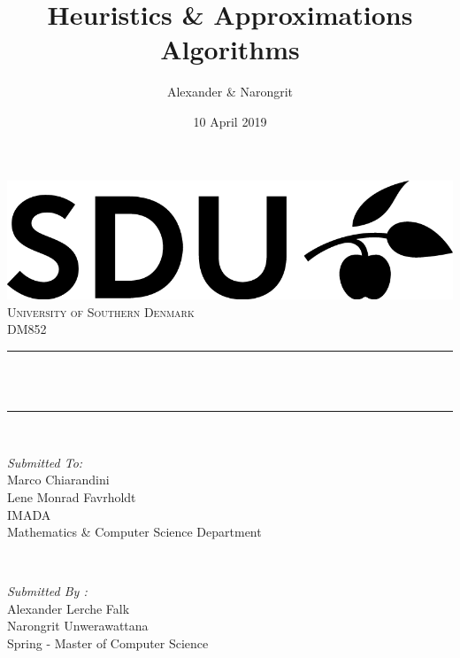 \documentclass[12pt]{article}
\title{Heuristics \& Approximations Algorithms}								%
\author{Alexander \& Narongrit}								%
\date{10 April 2019}											%
\makeatletter
\let\thetitle\@title
\makeatother
\begin{document}

\begin{titlepage}
	\centering
    \vspace*{0.5 cm}
    \includegraphics[scale = 0.75]{SDU_logo.png}\\[1.0 cm]	%
    \textsc{\LARGE University of Southern Denmark}\\[2.0 cm]	%
	\textsc{\Large DM852}\\[0.5 cm]				%
	\rule{\linewidth}{0.2 mm} \\[0.4 cm]
	{ \huge \bfseries \thetitle}\\
	\rule{\linewidth}{0.2 mm} \\[1.5 cm]
	
	\begin{minipage}{0.4\textwidth}
		\begin{flushleft} \large
			\emph{Submitted To:}\\
			Marco Chiarandini\\
            Lene Monrad Favrholdt \\
			IMADA \\
			Mathematics \& Computer Science Department \\
			\end{flushleft}
			\end{minipage}~
			\begin{minipage}{0.4\textwidth}
            
			\begin{flushright} \large
			\emph{Submitted By :} \\
			Alexander Lerche Falk\\
            Narongrit Unwerawattana\\
            Spring - Master of Computer Science\\
		\end{flushright}
        
	\end{minipage}\\[2 cm]
	
	
    
    
    
    
	
\end{titlepage}
\end{document}

